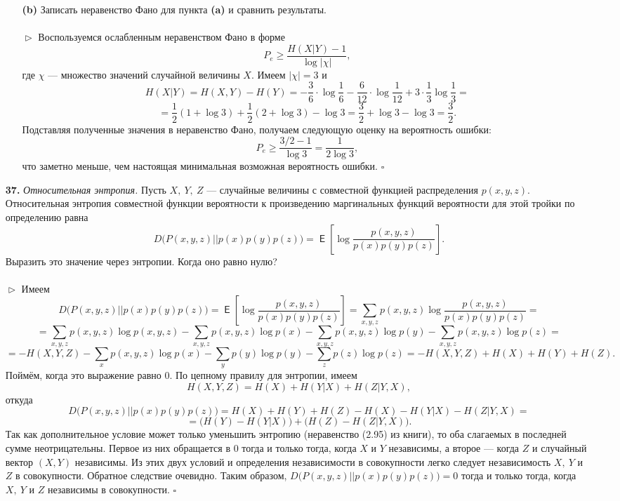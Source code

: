 \documentclass{article}
\DeclareMathOperator{\E}{\mathsf{E}}
\renewcommand{\ge}{\geqslant}
\begin{document}
\begin{enumerate}
\begin{enumerate}
\item[\bfseries (b)] Записать неравенство Фано для пункта {\bfseries (a)} и сравнить результаты.
\\\\$\vartriangleright$ Воспользуемся ослабленным неравенством Фано в форме 
$$P_e \ge \frac{H(X|Y) - 1}{\log |\chi|},$$
где $\chi$ --- множество значений случайной величины $X$. Имеем $|\chi| = 3$ и $$H(X|Y) = H(X, Y) - H(Y) = -\frac{3}{6} \cdot \log\frac{1}{6} - \frac{6}{12} \cdot \log\frac{1}{12} + 3 \cdot \frac{1}{3}\log\frac{1}{3} =$$
$$= \frac{1}{2}(1 + \log 3) + \frac{1}{2}(2 + \log 3) - \log 3 = \frac{3}{2} + \log 3 - \log 3 = \frac{3}{2}.$$
Подставляя полученные значения в неравенство Фано, получаем следующую оценку на вероятность ошибки:
$$P_e \ge \frac{3/2 - 1}{\log 3} = \frac{1}{2\log 3},$$
что заметно меньше, чем настоящая минимальная возможная вероятность ошибки. $\square$
\\
\end{enumerate} 
\item[\bfseries 37.] \textit{Относительная энтропия.} Пусть $X,\ Y,\ Z$ --- случайные величины с совместной функцией распределения $p(x, y, z).$ Относительная энтропия совместной функции вероятности к произведению маргинальных функций вероятности для этой тройки по определению равна
$$D\Big(P(x, y, z)||p(x)p(y)p(z)\Big) = \E \left[\log \frac{p(x, y, z)}{p(x)p(y)p(z)}\right].$$
Выразить это значение через энтропии. Когда оно равно нулю?
\\\\$\vartriangleright$ Имеем
$$D\Big(P(x, y, z)||p(x)p(y)p(z)\Big) = \E \left[\log \frac{p(x, y, z)}{p(x)p(y)p(z)}\right] = \sum_{x, y, z} p(x, y, z)\log \frac{p(x, y, z)}{p(x)p(y)p(z)} =$$
$$= \sum_{x, y, z} p(x, y, z)\log p(x, y, z) - \sum_{x, y, z} p(x, y, z)\log p(x) - \sum_{x, y, z} p(x, y, z)\log p(y) -\sum_{x, y, z} p(x, y, z)\log p(z) = $$
$$=-H(X, Y, Z) - \sum_{x} p(x, y, z)\log p(x) - \sum_{y} p(y)\log p(y) - \sum_{z} p(z)\log p(z) = -H(X, Y, Z) + H(X) + H(Y) + H(Z).$$
Поймём, когда это выражение равно $0$.
По цепному правилу для энтропии, имеем
$$H(X, Y, Z) = H(X) + H(Y|X) + H(Z|Y, X),$$ откуда
$$D\Big(P(x, y, z)||p(x)p(y)p(z)\Big) = H(X) + H(Y) + H(Z) - H(X) - H(Y|X) - H(Z|Y, X) = $$
$$=\Big(H(Y) - H(Y|X)\Big) + \Big(H(Z) - H(Z|Y, X)\Big).$$
Так как дополнительное условие может только уменьшить энтропию (неравенство (2.95) из книги), то оба слагаемых в последней сумме неотрицательны. Первое из них обращается в $0$ тогда и только тогда, когда $X$ и $Y$ независимы, а второе --- когда $Z$ и случайный вектор $(X, Y)$ независимы. Из этих двух условий и определения независимости в совокупности легко следует независимость $X,\ Y$ и $Z$ в совокупности. Обратное следствие очевидно. Таким образом, $D\Big(P(x, y, z)||p(x)p(y)p(z)\Big) = 0$ тогда и только тогда, когда $X,\ Y$ и $Z$ независимы в совокупности. $\square$

\end{enumerate}
\end{document}
